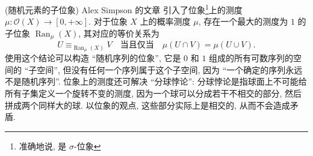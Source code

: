 \begin{example}
	{(随机元素的子位象)}
	Alex Simpson 的文章 \cite{SIMPSON20121642} 引入了位象\footnote{准确地说, 是 $\sigma$-位象}上的测度 $\mu\colon \mathcal O(X)\to [0,+\infty]$. 对于位象 $X$ 上的概率测度 $\mu$, 存在一个最大的测度为 $1$ 的子位象 $\operatorname{Ran}_\mu(X)$, 其对应的等价关系为
	$$
	U\equiv_{\operatorname{Ran}_\mu(X)} V \quad \text{当且仅当}\quad \mu(U\cap V) = \mu(U\cup V).
	$$
	使用这个结论可以构造 ``随机序列的位象'', 它是 $0$ 和 $1$ 组成的所有可数序列的空间的 ``子空间'', 但没有任何一个序列属于这个子空间, 因为 ``一个确定的序列永远不是随机序列''. 位象上的测度还可解决 ``分球悖论'': 分球悖论是指球面上不可能给所有子集定义一个旋转不变的测度, 因为一个球可以分成若干不相交的部分, 然后拼成两个同样大的球. 以位象的观点, 这些部分实际上是相交的, 从而不会造成矛盾.
\end{example}

%
%
%
%
%
%
%


